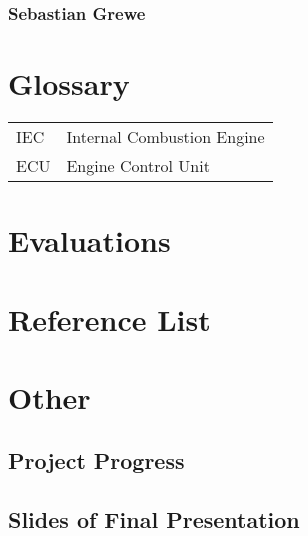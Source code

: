 \documentclass[12pt,a4paper,numbers=noenddot]{scrartcl}
\begin{document}
\subsubsection{Sebastian Grewe}

\newpage

\section{Glossary}
\begin{tabularx}{\textwidth}{p{3cm} l}
	IEC & Internal Combustion Engine \\
	ECU & Engine Control Unit \\
\end{tabularx}	
\newpage

\section{Evaluations}

\newpage

\section{Reference List}
\renewcommand{\refname}{Bibliography}
\printbibliography
\newpage

\section{Other}
\subsection{Project Progress}

\newpage

\subsection{Slides of Final Presentation}

\end{document}
